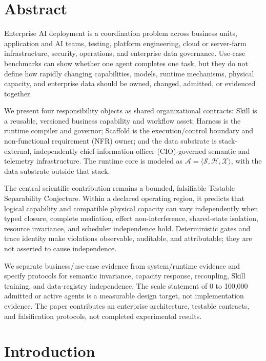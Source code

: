 

\section{Abstract}

Enterprise AI deployment is a coordination problem across business units, application and AI teams, testing, platform engineering, cloud or server-farm infrastructure, security, operations, and enterprise data governance. Use-case benchmarks can show whether one agent completes one task, but they do not define how rapidly changing capabilities, models, runtime mechanisms, physical capacity, and enterprise data should be owned, changed, admitted, or evidenced together.

We present four responsibility objects as shared organizational contracts: Skill is a reusable, versioned business capability and workflow asset; Harness is the runtime compiler and governor; Scaffold is the execution/control boundary and non-functional requirement (NFR) owner; and the data substrate is stack-external, independently chief-information-officer (CIO)-governed semantic and telemetry infrastructure. The runtime core is modeled as $\mathcal{A}=\langle\mathcal{S},\mathcal{H},\mathcal{X}\rangle$, with the data substrate outside that stack.

The central scientific contribution remains a bounded, falsifiable Testable Separability Conjecture. Within a declared operating region, it predicts that logical capability and compatible physical capacity can vary independently when typed closure, complete mediation, effect non-interference, shared-state isolation, resource invariance, and scheduler independence hold. Deterministic gates and trace identity make violations observable, auditable, and attributable; they are not asserted to cause independence.

We separate business/use-case evidence from system/runtime evidence and specify protocols for semantic invariance, capacity response, recoupling, Skill training, and data-registry independence. The scale statement of 0 to 100{,}000 admitted or active agents is a measurable design target, not implementation evidence. The paper contributes an enterprise architecture, testable contracts, and falsification protocols, not completed experimental results.

\section{Introduction}
\label{sec:introduction}

